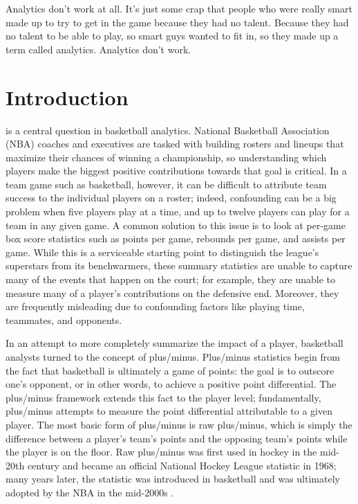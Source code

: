 
\begin{savequote}[75mm]
    Analytics don't work at all. It's just some crap that people who were really
    smart made up to try to get in the game because they had no talent. Because they
    had no talent to be able to play, so smart guys wanted to fit in, so they made
    up a term called analytics. Analytics don't work.

\end{savequote}
\chapter{Introduction} \label{ch:intro}

 is
a central question in basketball analytics. National Basketball Association (NBA)
coaches and executives are tasked with building rosters and lineups that maximize
their chances of winning a championship, so understanding which players make the
biggest positive contributions towards that goal is critical. In a team game such as
basketball, however, it can be difficult to attribute team success to the individual
players on a roster; indeed, confounding can be a big problem when five players play
at a time, and up to twelve players can play for a team in any given game. A common
solution to this issue is to look at per-game box score statistics such as points
per game, rebounds per game, and assists per game. While this is a serviceable
starting point to distinguish the league's superstars from its benchwarmers, these
summary statistics are unable to capture many of the events that happen on the
court; for example, they are unable to measure many of a player's contributions on
the defensive end. Moreover, they are frequently misleading due to confounding
factors like playing time, teammates, and opponents.

In an attempt to more completely summarize the impact of a player, basketball
analysts turned to the concept of plus/minus. Plus/minus statistics begin from the
fact that basketball is ultimately a game of points: the goal is to outscore one's
opponent, or in other words, to achieve a positive point differential. The
plus/minus framework extends this fact to the player level; fundamentally,
plus/minus attempts to measure the point differential attributable to a given
player. The most basic form of plus/minus is raw plus/minus, which is simply the
difference between a player's team's points and the opposing team's points while the
player is on the floor. Raw plus/minus was first used in hockey in the mid-20th
century and became an official National Hockey League statistic in 1968; many years
later, the statistic was introduced in basketball and was ultimately adopted by the
NBA in the mid-2000s \cite{SportingCharts}.

